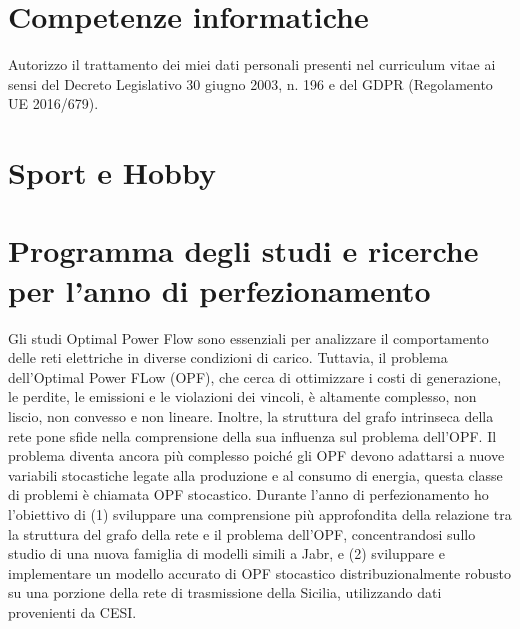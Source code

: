 \documentclass[11pt,a4paper,sans]{moderncv}        %
\begin{document}

\section{Competenze informatiche}



\newline 
\newline 
Autorizzo il trattamento dei miei dati personali presenti nel curriculum vitae ai sensi del Decreto Legislativo 30 giugno 2003, n. 196 e del GDPR (Regolamento UE
2016/679).

\section{Sport e Hobby}




\newpage

\section {Programma degli studi e ricerche per l'anno di perfezionamento}

Gli studi Optimal Power Flow sono essenziali per analizzare il comportamento delle reti elettriche in diverse condizioni di carico. Tuttavia, il problema dell'Optimal Power FLow (OPF), che cerca di ottimizzare i costi di generazione, le perdite, le emissioni e le violazioni dei vincoli, è altamente complesso, non liscio, non convesso e non lineare. Inoltre, la struttura del 
 grafo intrinseca della rete pone sfide nella comprensione della sua influenza sul problema dell'OPF. Il problema diventa ancora più complesso poiché gli OPF devono adattarsi a nuove variabili stocastiche legate alla produzione e al consumo di energia, questa classe di problemi è chiamata OPF stocastico. Durante l'anno di perfezionamento ho l'obiettivo di (1) sviluppare una comprensione più approfondita della relazione tra la struttura del grafo della rete e il problema dell'OPF, concentrandosi sullo studio di una nuova famiglia di modelli simili a Jabr, e (2) sviluppare e implementare un modello accurato di OPF stocastico distribuzionalmente robusto su una porzione della rete di trasmissione della Sicilia, utilizzando dati provenienti da CESI.
\nocite{*}

\end{document}
